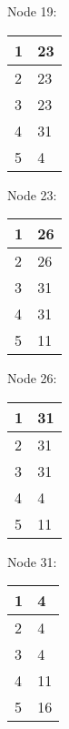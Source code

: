 \documentclass{scrartcl}
\begin{document}
    \begin{minipage}[t]{.25\linewidth}
        \centering
        Node 19:\\
        \begin{tabular}{|l|l|}
            \hline
            1 & 23 \\ \hline
            2 & 23 \\ \hline
            3 & 23 \\ \hline
            4 & 31 \\ \hline
            5 & 4 \\ \hline
        \end{tabular}
    \end{minipage}%

	\begin{minipage}[t]{.25\linewidth}
		\centering
        Node 23:\\
		\begin{tabular}{|l|l|}
			\hline
			1 & 26 \\ \hline
			2 & 26 \\ \hline
			3 & 31 \\ \hline
			4 & 31 \\ \hline
			5 & 11 \\ \hline
		\end{tabular}
	\end{minipage}%
	\begin{minipage}[t]{.25\linewidth}
		\centering
        Node 26:\\
		\begin{tabular}{|l|l|}
			\hline
			1 & 31 \\ \hline
			2 & 31 \\ \hline
			3 & 31 \\ \hline
			4 & 4 \\ \hline
			5 & 11 \\ \hline
		\end{tabular}
	\end{minipage}
	\begin{minipage}[t]{.25\linewidth}
		\centering
        Node 31:\\
		\begin{tabular}{|l|l|}
			\hline
			1 & 4 \\ \hline
			2 & 4 \\ \hline
			3 & 4 \\ \hline
			4 & 11 \\ \hline
			5 & 16 \\ \hline
		\end{tabular}
	\end{minipage}
\end{document}

